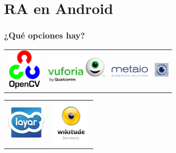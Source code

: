 \section{RA en Android}
\frame
{
\frametitle{¿Qué opciones hay?}
{\setlength{\arrayrulewidth}{0mm}
\begin{table}[ht]
  \centering
  \begin{tabular}{| m{3cm} | m{4cm} | m{4cm} |}
  \hline
  \includegraphics[height=2cm, width=1.8cm]{imgs/opencv.png} & 
     \hspace{2cm}\includegraphics[width=3cm]{imgs/vuforia.png} & 
     \hspace{2cm}\includegraphics[width=3cm]{imgs/metaio.jpg}
  \end{tabular}
\end{table}
}

{\setlength{\arrayrulewidth}{0mm}
\begin{table}[ht]
  \centering
  \begin{tabular}{| m{4cm} | m{4cm} |}
  \hline
  \includegraphics[width=2cm]{imgs/layar.jpg}& \includegraphics[width=2cm]{imgs/wikitude.png}
  \end{tabular}
\end{table}
}
}





